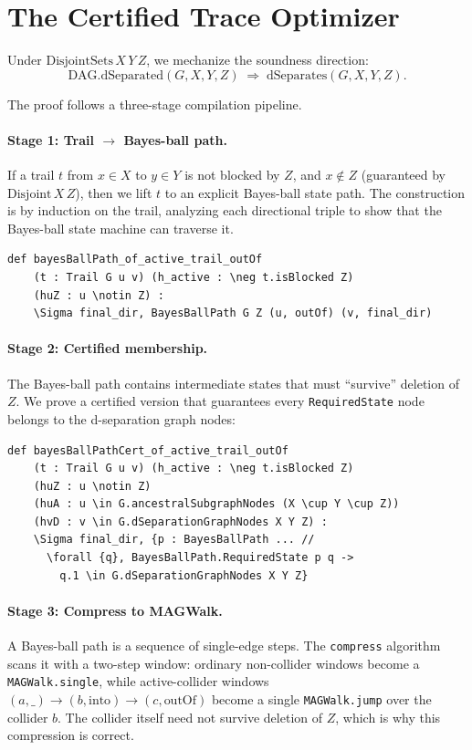 \documentclass[acmsmall,screen,nonacm]{acmart}
\newcommand{\lean}[1]{\lstinline!#1!}
\begin{document}
\section{The Certified Trace Optimizer}\label{sec:forward}

Under $\text{DisjointSets}\,X\,Y\,Z$, we mechanize the soundness direction:
\[
\text{DAG.dSeparated}(G,X,Y,Z) \;\Longrightarrow\; \text{dSeparates}(G,X,Y,Z).
\]

The proof follows a three-stage compilation pipeline.

\paragraph{Stage 1: Trail $\to$ Bayes-ball path.} If a trail $t$ from $x \in X$
to $y \in Y$ is not blocked by $Z$, and $x \notin Z$ (guaranteed by
$\text{Disjoint}\,X\,Z$), then we lift $t$ to an explicit Bayes-ball state path.
The construction is by induction on the trail, analyzing each directional triple
to show that the Bayes-ball state machine can traverse it.

\begin{lstlisting}[caption={Trail to Bayes-ball path}]
def bayesBallPath_of_active_trail_outOf
    (t : Trail G u v) (h_active : \neg t.isBlocked Z)
    (huZ : u \notin Z) :
    \Sigma final_dir, BayesBallPath G Z (u, outOf) (v, final_dir)
\end{lstlisting}

\paragraph{Stage 2: Certified membership.} The Bayes-ball path contains
intermediate states that must ``survive'' deletion of $Z$.  We prove a certified
version that guarantees every \lean{RequiredState} node belongs to the
d-separation graph nodes:

\begin{lstlisting}[caption={Certified Bayes-ball path}]
def bayesBallPathCert_of_active_trail_outOf
    (t : Trail G u v) (h_active : \neg t.isBlocked Z)
    (huZ : u \notin Z)
    (huA : u \in G.ancestralSubgraphNodes (X \cup Y \cup Z))
    (hvD : v \in G.dSeparationGraphNodes X Y Z) :
    \Sigma final_dir, {p : BayesBallPath ... //
      \forall {q}, BayesBallPath.RequiredState p q ->
        q.1 \in G.dSeparationGraphNodes X Y Z}
\end{lstlisting}

\paragraph{Stage 3: Compress to MAGWalk.} A Bayes-ball path is a sequence of
single-edge steps.  The \lean{compress} algorithm scans it with a two-step
window: ordinary non-collider windows become a \lean{MAGWalk.single}, while
active-collider windows $(a,\_) \to (b,\text{into}) \to (c,\text{outOf})$ become
a single \lean{MAGWalk.jump} over the collider $b$.  The collider itself need not
survive deletion of $Z$, which is why this compression is correct.
\end{document}
